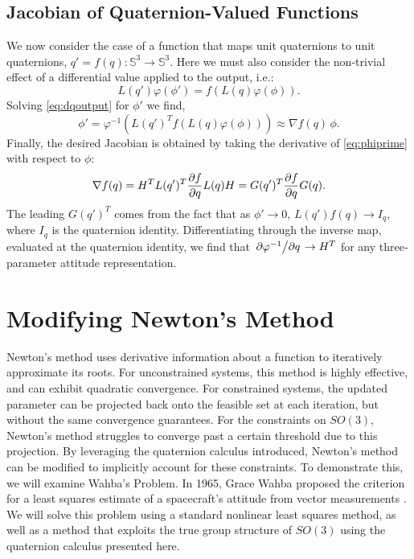 \documentclass[letterpaper, 10 pt, conference]{ieeeconf}  %
\newcommand{\Q}{\mathbb{S}^3}
\begin{document}
    \subsection{Jacobian of Quaternion-Valued Functions}
        We now consider the case of a function that maps unit quaternions to unit
        quaternions, $q' = f(q) : \Q \to \Q$. Here we must also consider the non-trivial
        effect of a differential value applied to the output, i.e.:
        \begin{equation} \label{eq:dqoutput}
            L(q') \varphi(\phi') = f(L(q)\varphi(\phi)) .
        \end{equation}
        Solving \eqref{eq:dqoutput} for $\phi'$ we find,
        \begin{equation} \label{eq:phiprime}
            \phi' = \varphi^{-1} \left( L(q')^T f(L(q)\varphi(\phi)) \right) \approx \nabla f(q) \, \phi.
        \end{equation}
        Finally, the desired Jacobian is obtained by taking the derivative of
        \eqref{eq:phiprime} with respect to $\phi$:
        \begin{equation} \label{eq:quat_jacobian}
            \nabla f(q) = H^T L(q')^T \pdv{f}{q} L(q) H = G(q')^T \pdv{f}{q} G(q).
        \end{equation}
        The leading $G(q')^T$ comes from the fact that as $\phi' \to 0$, $L(q') f(q) \to
        I_q$, where $I_q$ is the quaternion identity. Differentiating through the inverse
        map, evaluated at the quaternion identity, we find that $\pdv*{\varphi^{-1}}{q}
        \to H^T$ for any three-parameter attitude representation.


\section{Modifying Newton's Method} \label{sec:Wahbas}

    Newton's method uses derivative information about a function to iteratively
    approximate its roots. For unconstrained systems, this method is highly effective,
    and can exhibit quadratic convergence. For constrained systems, the updated parameter
    can be projected back onto the feasible set at each iteration, but without the same
    convergence guarantees. For the constraints on $SO(3)$, Newton's method struggles to
    converge past a certain threshold due to this projection. By leveraging the
    quaternion calculus introduced, Newton's method can be modified to implicitly account
    for these constraints. To demonstrate this, we will examine Wahba's Problem. In 1965,
    Grace Wahba proposed the criterion for a least squares estimate of a spacecraft's
    attitude from vector measurements \cite{markley2014fundamentals}. We will solve this
    problem using a standard nonlinear least squares method, as well as a method that
    exploits the true group structure of $SO(3)$ using the quaternion calculus presented
    here.
    
\end{document}
